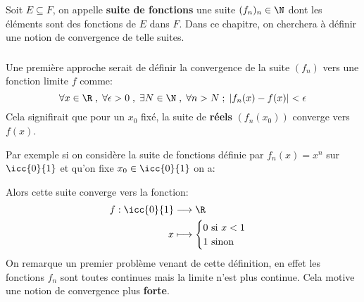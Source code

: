 \chapter*{}
Soit \(E \subseteq F\), on appelle \textbf{suite de fonctions} une suite \((f_n)_n\in\N\) dont les éléments sont des fonctions de \(E\) dans \(F\). Dans ce chapitre, on cherchera à définir une notion de convergence de telle suites.

\subsection*{}
Une première approche serait de définir la convergence de la suite \((f_n)\) vers une fonction limite \(f\) comme:
\[
   \forall x \in \R \; , \; \forall \epsilon > 0 \; , \; \exists N \in \N \; , \; \forall n > N \; ; \; |f_n(x) - f(x)| < \epsilon
\]
Cela signifirait que pour un \(x_0\) fixé, la suite de \textbf{réels} \((f_n(x_0))\) converge vers \(f(x)\).\<

Par exemple si on considère la suite de fonctions définie par \(f_n(x) = x^n\) sur \(\icc{0}{1}\) et qu'on fixe \(x_0 \in \icc{0}{1}\) on a:

\begin{center}
\end{center}

Alors cette suite converge vers la fonction:
\[
   \begin{aligned}
      f : \icc{0}{1} &\longrightarrow \R\\
      x &\longmapsto \begin{cases}
         0 \text{ si } x < 1 \\
         1 \text{ sinon}
      \end{cases} 
   \end{aligned}
\]
On remarque un premier problème venant de cette définition, en effet les fonctions \(f_n\) sont toutes continues mais la limite n'est plus continue. Cela motive une notion de convergence plus \textbf{forte}.
